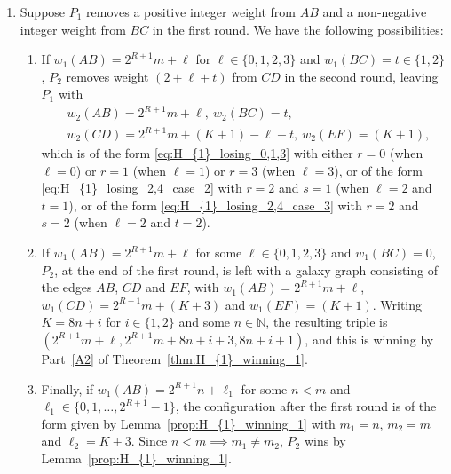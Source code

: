 \documentclass[11pt,reqno]{amsart}
\theoremstyle{definition}
\theoremstyle{definition}
\begin{document}
\begin{enumerate}
\begin{enumerate}
\item Finally, if $w_{1}(CD)=2^{R+1}n+\ell_{1}$ for some $n<m$ and $\ell_{1}\in\{0,1,\ldots,2^{R+1}-1\}$, the configuration after the first round is of the form given by Lemma~\ref{prop:H_{1}_winning_1} with $m_{1}=n$, $m_{2}=m$ and $\ell_{2}=4$. Since $n<m \implies m_{1}\neq m_{2}$, $P_{2}$ wins by Lemma~\ref{prop:H_{1}_winning_1}.
\end{enumerate}

\item Suppose $P_{1}$ removes a positive integer weight from $AB$ and a non-negative integer weight from $BC$ in the first round. We have the following possibilities:
\begin{enumerate}
\item If $w_{1}(AB)=2^{R+1}m+\ell$ for $\ell \in \{0,1,2,3\}$ and $w_{1}(BC)=t\in \{1,2\}$, $P_{2}$ removes weight $(2+\ell+t)$ from $CD$ in the second round, leaving $P_{1}$ with 
\begin{align}
{}&w_{2}(AB)=2^{R+1}m+\ell,\ w_{2}(BC)=t,\nonumber\\
{}&w_{2}(CD)=2^{R+1}m+(K+1)-\ell-t,\ w_{2}(EF)=(K+1),\nonumber
\end{align}
which is of the form \eqref{eq:H_{1}_losing_0,1,3} with either $r=0$ (when $\ell=0$) or $r=1$ (when $\ell=1$) or $r=3$ (when $\ell=3$), or of the form \eqref{eq:H_{1}_losing_2,4_case_2} with $r=2$ and $s=1$ (when $\ell=2$ and $t=1$), or of the form \eqref{eq:H_{1}_losing_2,4_case_3} with $r=2$ and $s=2$ (when $\ell=2$ and $t=2$). 

\item If $w_{1}(AB)=2^{R+1}m+\ell$ for some $\ell \in \{0,1,2,3\}$ and $w_{1}(BC)=0$, $P_{2}$, at the end of the first round, is left with a galaxy graph consisting of the edges $AB$, $CD$ and $EF$, with $w_{1}(AB)=2^{R+1}m+\ell$, $w_{1}(CD)=2^{R+1}m+(K+3)$ and $w_{1}(EF)=(K+1)$. Writing $K=8n+i$ for $i \in \{1,2\}$ and some $n \in \mathbb{N}$, the resulting triple is $\left(2^{R+1}m+\ell,2^{R+1}m+8n+i+3,8n+i+1\right)$, and this is winning by Part~\eqref{A2} of Theorem~\ref{thm:H_{1}_winning_1}. 

\item Finally, if $w_{1}(AB)=2^{R+1}n+\ell_{1}$ for some $n<m$ and $\ell_{1}\in\{0,1,\ldots,2^{R+1}-1\}$, the configuration after the first round is of the form given by Lemma~\ref{prop:H_{1}_winning_1} with $m_{1}=n$, $m_{2}=m$ and $\ell_{2}=K+3$. Since $n<m \implies m_{1}\neq m_{2}$, $P_{2}$ wins by Lemma~\ref{prop:H_{1}_winning_1}.
\end{enumerate}


\end{enumerate}
\end{document}
